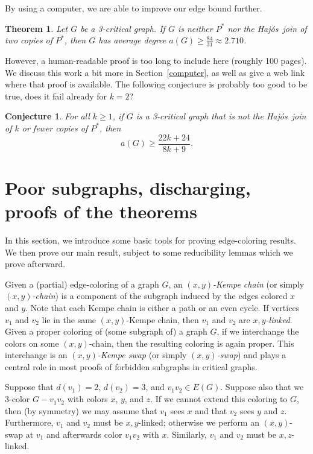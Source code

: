 \documentclass[12pt]{article}
\theoremstyle{plain}
\newtheorem{thm}{Theorem}
\newtheorem{conj}[prop]{Conjecture}
\theoremstyle{definition}
\theoremstyle{remark}
\def\hajos{Haj\'{o}s}
\begin{document}
By using a computer, we are able to improve our edge bound further.
\begin{thm}
Let $G$ be a 3-critical graph.  If $G$ is neither $P^*$ nor the
\hajos\ join of two copies of $P^*$, then $G$ has average degree $a(G)\ge
\frac{84}{31}\approx 2.710$.
\label{thm:main2}
\end{thm}
\noindent
However, a
human-readable proof is too long to include here (roughly 100 pages).  We
discuss this work a bit more in Section~\ref{computer}, as well as give a
web link where that proof is available.  The following conjecture is probably too good to be true, does it fail already for $k=2$?

\begin{conj}
For all $k \ge 1$, if $G$ is a 3-critical graph that is not the \hajos\ join of $k$ or fewer copies of $P^*$, then \[a(G)\ge \frac{22k+24}{8k+9}.\]
\end{conj}

\section{Poor subgraphs, discharging, proofs of the theorems}
\label{sec:discharging}
In this section, we introduce some basic tools for proving edge-coloring
results.  We then prove our main result, subject to some reducibility lemmas
which we prove afterward.

Given a (partial) edge-coloring of a graph $G$, an \emph{$(x,y)$-Kempe chain}
(or simply \emph{$(x,y)$-chain})
is a component of the subgraph induced by the edges colored $x$ and $y$.  Note
that each Kempe chain is either a path or an even cycle.  
If vertices $v_1$ and $v_2$ lie in the same $(x,y)$-Kempe chain, then $v_1$ and
$v_2$ are \emph{$x,y$-linked}.
Given a proper coloring of (some subgraph of) a graph $G$, if we interchange
the colors on some $(x,y)$-chain, then the resulting coloring is again proper.
 This interchange is an \emph{$(x,y)$-Kempe swap} (or simply
\emph{$(x,y)$-swap}) and plays a central role in most proofs of forbidden
subgraphs in critical graphs.

Suppose that $d(v_1)=2$, $d(v_2)=3$, and $v_1v_2\in E(G)$.  Suppose also that we
3-color $G-v_1v_2$ with colors $x$, $y$, and $z$.  If we cannot extend this
coloring to $G$, then (by symmetry) we may assume that $v_1$ sees $x$ and that
$v_2$ sees $y$ and $z$.  Furthermore, $v_1$ and $v_2$ must be $x,y$-linked;
otherwise we perform an $(x,y)$-swap at $v_1$ and afterwards color $v_1v_2$
with $x$.  Similarly, $v_1$ and $v_2$ must be $x,z$-linked.
%
\end{document}
